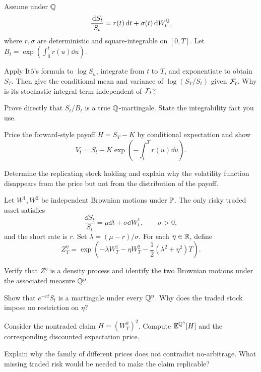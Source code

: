 \begin{exercise}
Assume under \(\mathbb Q\)
\[
\frac{\,\mathrm d S_t}{S_t}=r(t)\,\mathrm d t+\sigma(t)\,\mathrm d W_t^{\mathbb Q},
\]
where \(r,\sigma\) are deterministic and square-integrable on \([0,T]\).
Let \(B_t=\exp(\int_0^tr(u)\dd u)\).

\begin{exparts}
  \item Apply It\^o's formula to \(\log S_u\), integrate from \(t\) to
  \(T\), and exponentiate to obtain \(S_T\). Then give the conditional
  mean and variance of \(\log(S_T/S_t)\) given \(\mathcal F_t\). Why is its
  stochastic-integral term independent of \(\mathcal F_t\)?
  \item Prove directly that \(S_t/B_t\) is a true \(\mathbb Q\)-martingale.
  State the integrability fact you use.
  \item Price the forward-style payoff \(H=S_T-K\) by conditional
  expectation and show
  \[
  V_t=S_t-K\exp\!\left(-\int_t^T r(u)\dd u\right).
  \]
  \item Determine the replicating stock holding and explain why the
  volatility function disappears from the price but not from the
  distribution of the payoff.
\end{exparts}
\end{exercise}

\begin{exercise}
Let \(W^1,W^2\) be independent Brownian motions under \(\mathbb P\). The only
risky traded asset satisfies
\[
\frac{\dd S_t}{S_t}=\mu\dd t+\sigma\dd W_t^1,
\qquad \sigma>0,
\]
and the short rate is \(r\). Set \(\lambda=(\mu-r)/\sigma\). For each
\(\eta\in\mathbb{R}\), define
\[
Z_T^\eta=
\exp\!\left(
-\lambda W_T^1-\eta W_T^2
-\frac12(\lambda^2+\eta^2)T
\right).
\]
\begin{exparts}
  \item Verify that \(Z^\eta\) is a density process and identify the two
  Brownian motions under the associated measure \(\mathbb Q^\eta\).
  \item Show that \(e^{-rt}S_t\) is a martingale under every
  \(\mathbb Q^\eta\). Why does the traded stock impose no restriction on
  \(\eta\)?
  \item Consider the nontraded claim \(H=(W_T^2)^2\). Compute
  \(\mathbb E^{\mathbb Q^\eta}[H]\) and the corresponding discounted expectation price.
  \item Explain why the family of different prices does not contradict
  no-arbitrage. What missing traded risk would be needed to make the claim
  replicable?
\end{exparts}
\end{exercise}


